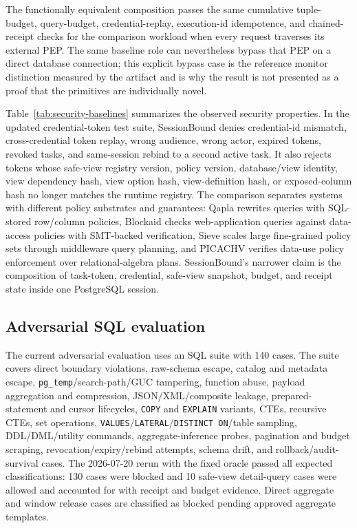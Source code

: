 \documentclass[journal]{IEEEtran}
\begin{document}
The functionally equivalent composition passes the same cumulative tuple-budget,
query-budget, credential-replay, execution-id idempotence, and chained-receipt
checks for the comparison workload when every request traverses its external
PEP. The same baseline role can nevertheless bypass that PEP on a direct
database connection; this explicit bypass case is the reference monitor
distinction measured by the artifact and is why the result is not presented as
a proof that the primitives are individually novel.

Table~\ref{tab:security-baselines} summarizes the observed security
properties. In the updated credential-token test suite, SessionBound
denies credential-id mismatch, cross-credential token replay, wrong
audience, wrong actor, expired tokens, revoked tasks, and same-session
rebind to a second active task. It also rejects tokens whose safe-view
registry version, policy version, database/view identity, view dependency
hash, view option hash, view-definition hash, or exposed-column hash no
longer matches the runtime registry. The comparison separates systems with
different policy substrates and guarantees: Qapla rewrites queries with
SQL-stored row/column policies, Blockaid checks web-application queries
against data-access policies with SMT-backed verification, Sieve scales
large fine-grained policy sets through middleware query planning, and
PICACHV verifies data-use policy enforcement over relational-algebra
plans. SessionBound's narrower claim is the composition of task-token,
credential, safe-view snapshot, budget, and receipt state inside one
PostgreSQL session.

\hypertarget{adversarial-sql-evaluation}{%
\subsection{Adversarial SQL evaluation}\label{adversarial-sql-evaluation}}

The current adversarial evaluation uses an SQL suite with 140 cases.
The suite covers direct boundary violations, raw-schema escape, catalog
and metadata escape, \texttt{pg\_temp}/search-path/GUC tampering,
function abuse, payload aggregation and compression, JSON/XML/composite
leakage, prepared-statement and cursor lifecycles, \texttt{COPY} and
\texttt{EXPLAIN} variants, CTEs, recursive CTEs, set operations,
\texttt{VALUES}/\texttt{LATERAL}/\texttt{DISTINCT ON}/table sampling,
DDL/DML/utility commands, aggregate-inference probes, pagination and
budget scraping, revocation/expiry/rebind attempts, schema drift, and
rollback/audit-survival cases. The 2026-07-20 rerun with the fixed
oracle passed all expected classifications: 130 cases were blocked and
10 safe-view detail-query cases were allowed and accounted for with
receipt and budget evidence. Direct aggregate and window release cases
are classified as blocked pending approved aggregate templates.
\end{document}
